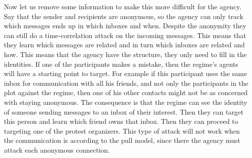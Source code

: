 Now let us remove some information to make this more difficult for the agency.
Say that the sender and recipients are anonymous, so the agency can only track 
which messages ends up in which inboxes and when.
Despite the anonymity they can still do a time-correlation attack on the 
incoming messages.
This means that they learn which messages are related and in turn which inboxes 
are related and how.
This means that the agency have the structure, they only need to fill in the 
identities.
If one of the participants makes a mistake, then the regime's agents will have 
a starting point to target.
For example if this participant uses the same inbox for communication with all 
his friends, and not only the participants in the plot against the regime, then 
one of his other contacts might not be as concerned with staying anonymous.
The consequence is that the regime can see the identity of someone sending 
messages to an inbox of their interest.
Then they can target this person and learn which friend owns that inbox.
Then they can proceed to targeting one of the protest organizers.
This type of attack will not work when the communication is according to the 
pull model, since there the agency must attack each anonymous connection.
